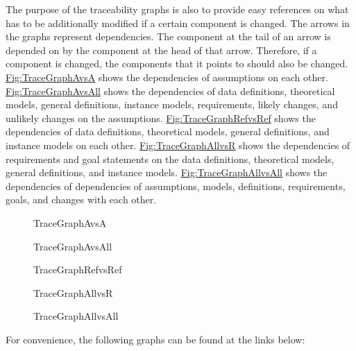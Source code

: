 \documentclass[12pt]{article}
\begin{document}
The purpose of the traceability graphs is also to provide easy references on what has to be additionally modified if a certain component is changed. The arrows in the graphs represent dependencies. The component at the tail of an arrow is depended on by the component at the head of that arrow. Therefore, if a component is changed, the components that it points to should also be changed. \hyperref[Figure:TraceGraphAvsA]{Fig:TraceGraphAvsA} shows the dependencies of assumptions on each other. \hyperref[Figure:TraceGraphAvsAll]{Fig:TraceGraphAvsAll} shows the dependencies of data definitions, theoretical models, general definitions, instance models, requirements, likely changes, and unlikely changes on the assumptions. \hyperref[Figure:TraceGraphRefvsRef]{Fig:TraceGraphRefvsRef} shows the dependencies of data definitions, theoretical models, general definitions, and instance models on each other. \hyperref[Figure:TraceGraphAllvsR]{Fig:TraceGraphAllvsR} shows the dependencies of requirements and goal statements on the data definitions, theoretical models, general definitions, and instance models. \hyperref[Figure:TraceGraphAllvsAll]{Fig:TraceGraphAllvsAll} shows the dependencies of dependencies of assumptions, models, definitions, requirements, goals, and changes with each other.

\begin{figure}[H]
\begin{center}

\caption{TraceGraphAvsA}
\label{Figure:TraceGraphAvsA}
\end{center}
\end{figure}
\begin{figure}[H]
\begin{center}

\caption{TraceGraphAvsAll}
\label{Figure:TraceGraphAvsAll}
\end{center}
\end{figure}
\begin{figure}[H]
\begin{center}

\caption{TraceGraphRefvsRef}
\label{Figure:TraceGraphRefvsRef}
\end{center}
\end{figure}
\begin{figure}[H]
\begin{center}

\caption{TraceGraphAllvsR}
\label{Figure:TraceGraphAllvsR}
\end{center}
\end{figure}
\begin{figure}[H]
\begin{center}

\caption{TraceGraphAllvsAll}
\label{Figure:TraceGraphAllvsAll}
\end{center}
\end{figure}
For convenience, the following graphs can be found at the links below:
\end{document}
